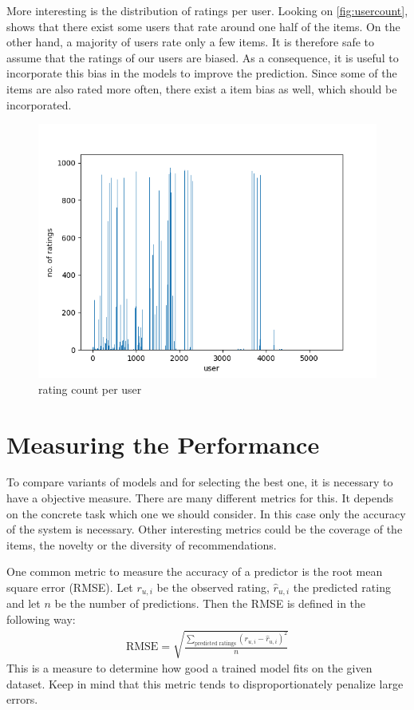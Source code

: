 \documentclass[DIV=14,twocolumn]{scrartcl}
\begin{document}
More interesting is the distribution of ratings per user. Looking on \autoref{fig:usercount}, shows that there exist some users that rate around one half of the items. On the other hand, a majority of users rate only a few items. It is therefore safe to assume that the ratings of our users are biased. As a consequence, it is useful to incorporate this bias in the models to improve the prediction.
Since some of the items are also rated more often, there exist a item bias as well, which should be incorporated.
\begin{figure}
	\includegraphics[width=\columnwidth]{../img/user-count}
	\caption{rating count per user}
	\label{fig:usercount}
\end{figure}

\section{Measuring the Performance}
To compare variants of models and for selecting the best one, it is necessary to have a objective measure. There are many different metrics for this. It depends on the concrete task which one we should consider. In this case only the accuracy of the system is necessary. Other interesting metrics could be the coverage of the items, the novelty or the diversity of recommendations.

One common metric to measure the accuracy of a predictor is the root mean square error (RMSE). Let $r_{u,i}$ be the observed rating, $\hat{r}_{u,i}$ the predicted rating and let $n$ be the number of predictions. Then the RMSE is defined in the following way: 
\begin{equation*}
\begin{split}
\text{RMSE} = \sqrt{\frac{\sum_{\text{predicted ratings}} (r_{u,i}-\hat{r}_{u,i})^2}{n}}
\end{split}
\end{equation*}
This is a measure to determine how good a trained model fits on the given dataset. Keep in mind that this metric tends to disproportionately penalize large errors. 
\end{document}
